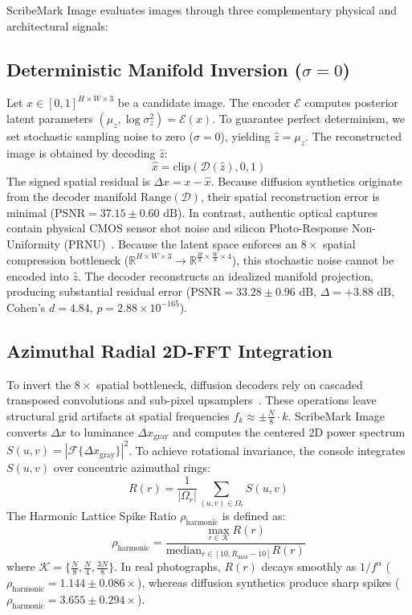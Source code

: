\documentclass[letterpaper]{article}
\begin{document}
ScribeMark Image evaluates images through three complementary physical and architectural signals:

\subsection{Deterministic Manifold Inversion ($\sigma = 0$)}
Let $x \in [0, 1]^{H \times W \times 3}$ be a candidate image. The encoder $\mathcal{E}$ computes posterior latent parameters $(\mu_z, \log \sigma_z^2) = \mathcal{E}(x)$. To guarantee perfect determinism, we set stochastic sampling noise to zero ($\sigma = 0$), yielding $\hat{z} = \mu_z$. The reconstructed image is obtained by decoding $\hat{z}$:
\begin{equation}
\hat{x} = \text{clip}\left(\mathcal{D}(\hat{z}), 0, 1\right)
\end{equation}
The signed spatial residual is $\Delta x = x - \hat{x}$. Because diffusion synthetics originate from the decoder manifold $\text{Range}(\mathcal{D})$, their spatial reconstruction error is minimal ($\text{PSNR} = 37.15 \pm 0.60\text{ dB}$). In contrast, authentic optical captures contain physical CMOS sensor shot noise and silicon Photo-Response Non-Uniformity (PRNU)~\cite{fridrich2009digital,lukas2006digital}. Because the latent space enforces an $8\times$ spatial compression bottleneck ($\mathbb{R}^{H \times W \times 3} \to \mathbb{R}^{\frac{H}{8} \times \frac{W}{8} \times 4}$), this stochastic noise cannot be encoded into $\hat{z}$. The decoder reconstructs an idealized manifold projection, producing substantial residual error ($\text{PSNR} = 33.28 \pm 0.96\text{ dB}$, $\Delta = +3.88\text{ dB}$, Cohen's $d = 4.84$, $p = 2.88 \times 10^{-165}$).

\subsection{Azimuthal Radial 2D-FFT Integration}
To invert the $8\times$ spatial bottleneck, diffusion decoders rely on cascaded transposed convolutions and sub-pixel upsamplers~\cite{durall2020watch,frank2020leveraging}. These operations leave structural grid artifacts at spatial frequencies $f_k \approx \pm \frac{N}{8} \cdot k$. ScribeMark Image converts $\Delta x$ to luminance $\Delta x_{\text{gray}}$ and computes the centered 2D power spectrum $S(u, v) = |\mathcal{F}\{\Delta x_{\text{gray}}\}|^2$. To achieve rotational invariance, the console integrates $S(u, v)$ over concentric azimuthal rings:
\begin{equation}
R(r) = \frac{1}{|\Omega_r|} \sum_{(u, v) \in \Omega_r} S(u, v)
\end{equation}
The Harmonic Lattice Spike Ratio $\rho_{\text{harmonic}}$ is defined as:
\begin{equation}
\rho_{\text{harmonic}} = \frac{\max_{r \in \mathcal{K}} R(r)}{\text{median}_{r \in [10, R_{\max}-10]} R(r)}
\end{equation}
where $\mathcal{K} = \{ \frac{N}{8}, \frac{N}{4}, \frac{3N}{8} \}$. In real photographs, $R(r)$ decays smoothly as $1/f^\alpha$ ($\rho_{\text{harmonic}} = 1.144 \pm 0.086\times$), whereas diffusion synthetics produce sharp spikes ($\rho_{\text{harmonic}} = 3.655 \pm 0.294\times$).
\end{document}
